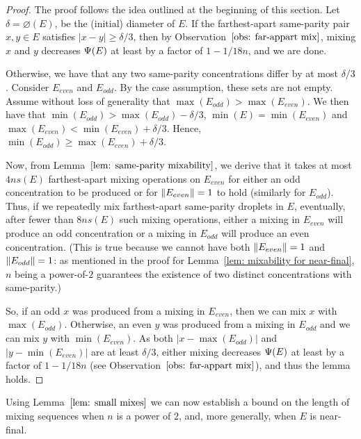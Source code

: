\begin{proof} 
	The proof follows the idea outlined at the beginning of this section. 
	Let $\delta=\diameter(E)$, be the (initial) diameter of $E$.
	If the farthest-apart same-parity  pair $x,y\in E$ satisfies
	$|x-y|\geq \delta/3$, then by Observation~$\ref{obs: far-appart mix}$,
	mixing $x$ and $y$ decreases ${\Psi}(E)$ at least by a factor of $1-1/18n$, 
	and we are done. 
	
	Otherwise, we have that any two same-parity concentrations differ by at most $\delta/3$.
	Consider $E_{even}$ and $E_{odd}$. By the case assumption, these sets are not empty.
	Assume without loss of generality that $\max(E_{odd}) > \max(E_{even})$.
	We then have that $\min(E_{odd}) > \max(E_{odd}) - \delta/3$,
	$\min(E) = \min(E_{even})$  and $\max(E_{even}) < \min(E_{even}) + \delta/3$.
	Hence, $\min(E_{odd})  \ge \max(E_{even}) + \delta/3$.
	
	Now, from Lemma~$\ref{lem: same-parity mixability}$, 
	we derive that it takes at most $4ns(E)$ farthest-apart mixing operations on $E_{even}$ 
	for either an odd concentration to be produced or for ${\|E_{even}\|} = 1$ to hold 
	(similarly for $E_{odd}$). 
	Thus, if we repeatedly mix farthest-apart same-parity droplets in $E$,
	eventually, after fewer than $8ns(E)$ such mixing operations,	
	either a mixing in $E_{even}$ will produce an odd concentration or 
	a mixing in $E_{odd}$ will produce an even concentration.
	(This is true because we cannot have both ${\|E_{even}\|} = 1$ 
	and ${\|E_{odd}\|} = 1$:
	as mentioned in the proof for Lemma~\ref{lem: mixability for near-final},
	$n$ being a power-of-$2$ guarantees the existence of two distinct concentrations with same-parity.)
	
	So, if an odd $x$ was produced from a mixing in $E_{even}$, then we can mix $x$ with $\max(E_{odd})$.
	Otherwise, an even $y$ was produced from a mixing in $E_{odd}$ and we can mix $y$ with $\min(E_{even})$.
	As both $|x-\max(E_{odd})|$ and $|y-\min(E_{even})|$ are at least $\delta/3$, 
	either mixing decreases ${\Psi}(E)$ at least by a factor of $1-1/18n$
	(see Observation~$\ref{obs: far-appart mix}$), and thus the lemma holds.
\end{proof}         


Using Lemma~$\ref{lem: small mixes}$ we can now establish a bound on the length of mixing sequences
when $n$ is a power of $2$, and, more generally, when $E$ is near-final.

